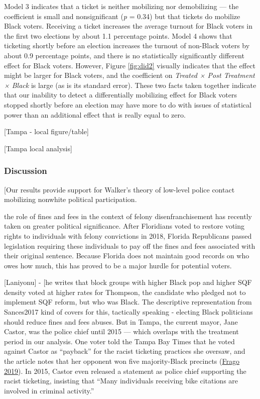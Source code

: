 \documentclass[
  12pt,
]{article}
\begin{document}
Model 3 indicates that a ticket is neither mobilizing nor demobilizing --- the coefficient is small and nonsignificant (\emph{p} = 0.34) but that tickets do mobilize Black voters. Receiving a ticket increases the average turnout for Black voters in the first two elections by about 1.1 percentage points. Model 4 shows that ticketing shortly before an election increases the turnout of non-Black voters by about 0.9 percentage points, and there is no statistically significantly different effect for Black voters. However, Figure \ref{fig:did2} visually indicates that the effect might be larger for Black voters, and the coefficient on \emph{Treated × Post Treatment × Black} is large (as is its standard error). These two facts taken together indicate that our inability to detect a differentially mobilizing effect for Black voters stopped shortly before an election may have more to do with issues of statistical power than an additional effect that is really equal to zero.

{[}Tampa - local figure/table{]}

{[}Tampa local analysis{]}

\hypertarget{discussion}{%
\subsubsection*{Discussion}\label{discussion}}

{[}Our results provide support for Walker's theory of low-level police contact mobilizing nonwhite political participation.

the role of fines and fees in the context of felony disenfranchisement has recently taken on greater political significance. After Floridians voted to restore voting rights to individuals with felony convictions in 2018, Florida Republicans passed legislation requiring these individuals to pay off the fines and fees associated with their original sentence. Because Florida does not maintain good records on who owes how much, this has proved to be a major hurdle for potential voters.

{[}Laniyonu{]} - {[}he writes that block groups with higher Black pop and higher SQF density voted at higher rates for Thompson, the candidate who pledged not to implement SQF reform, but who was Black. The descriptive representation from Sances2017 kind of covers for this, tactically speaking - electing Black politicians should reduce fines and fees abuses. But in Tampa, the current mayor, Jane Castor, was the police chief until 2015 --- which overlaps with the treatment period in our analysis. One voter told the Tampa Bay Times that he voted against Castor as ``payback'' for the racist ticketing practices she oversaw, and the article notes that her opponent won five majority-Black precincts (\protect\hyperlink{ref-Frago2019}{Frago 2019}). In 2015, Castor even released a statement as police chief supporting the racist ticketing, insisting that ``Many individuals receiving bike citations are involved in criminal activity.''
\end{document}
